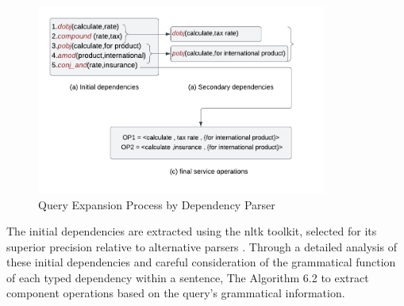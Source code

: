 \begin{figure}[hbt]
\hypertarget{fig:disco-query-exp}{%
\centering
\includegraphics[width=0.85\textwidth]{../figures/MyFigures/QE.pdf}
\captionsetup{justification=centering}
\caption{Query Expansion Process by Dependency Parser}\label{fig:disco-query-exp}
}
\end{figure}

The initial dependencies are extracted using the \gls{nltk} toolkit, selected for its superior precision relative to alternative parsers \autocite{Zhang2019}. Through a detailed analysis of these initial dependencies and careful consideration of the grammatical function of each typed dependency within a sentence, The Algorithm 6.2 to extract component operations based on the query's grammatical information.

